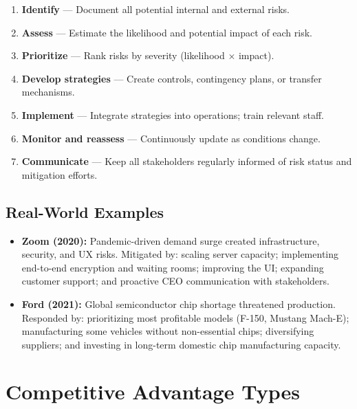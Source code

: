 \documentclass[11pt, letterpaper]{article}
\begin{document}
\begin{enumerate}[leftmargin=*, label=\textbf{Step \arabic*.}]
  \item \textbf{Identify} --- Document all potential internal and external risks.
  \item \textbf{Assess} --- Estimate the likelihood and potential impact of each risk.
  \item \textbf{Prioritize} --- Rank risks by severity (likelihood $\times$ impact).
  \item \textbf{Develop strategies} --- Create controls, contingency plans, or transfer mechanisms.
  \item \textbf{Implement} --- Integrate strategies into operations; train relevant staff.
  \item \textbf{Monitor and reassess} --- Continuously update as conditions change.
  \item \textbf{Communicate} --- Keep all stakeholders regularly informed of risk status and mitigation efforts.
\end{enumerate}

\subsection{Real-World Examples}

\begin{itemize}[leftmargin=*]
  \item \textbf{Zoom (2020):} Pandemic-driven demand surge created infrastructure, security, and UX risks. Mitigated by: scaling server capacity; implementing end-to-end encryption and waiting rooms; improving the UI; expanding customer support; and proactive CEO communication with stakeholders.
  \item \textbf{Ford (2021):} Global semiconductor chip shortage threatened production. Responded by: prioritizing most profitable models (F-150, Mustang Mach-E); manufacturing some vehicles without non-essential chips; diversifying suppliers; and investing in long-term domestic chip manufacturing capacity.
\end{itemize}

\newpage

\section{Competitive Advantage Types}
\end{document}
